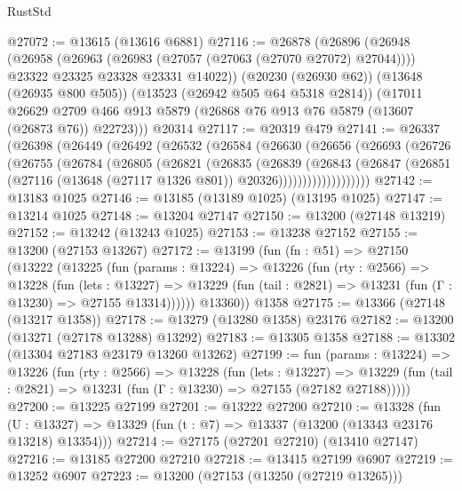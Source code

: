 \begin{lexlean}{RustStd}
\begin{coremodule}
@27072 := @13615 (@13616 @6881)
@27116 := @26878
    (@26896
      (@26948
        (@26958
          (@26963 (@26983 (@27057 (@27063 (@27070 @27072) @27044))))
          @23322
          @23325
          @23328
          @23331
          @14022))
      (@20230 (@26930 @62))
      (@13648 (@26935 @800 @505))
      (@13523 (@26942 @505 @64 @5318 @2814))
      (@17011
        @26629
        @2709
        @466
        @913
        @5879
        (@26868 @76 @913 @76 @5879 (@13607 (@26873 @76)) @22723)))
    @20314
@27117 := @20319 @479
@27141 := @26337
    (@26398
      (@26449
        (@26492
          (@26532
            (@26584
              (@26630
                (@26656
                  (@26693
                    (@26726
                      (@26755
                        (@26784
                          (@26805
                            (@26821
                              (@26835
                                (@26839
                                  (@26843
                                    (@26847
                                      (@26851
                                        (@27116
                                          (@13648 (@27117 @1326 @801))
                                          @20326)))))))))))))))))))
@27142 := @13183 @1025
@27146 := @13185 (@13189 @1025) (@13195 @1025)
@27147 := @13214 @1025
@27148 := @13204 @27147
@27150 := @13200 (@27148 @13219)
@27152 := @13242 (@13243 @1025)
@27153 := @13238 @27152
@27155 := @13200 (@27153 @13267)
@27172 := @13199
    (fun (fn : @51) =>
    @27150
      (@13222
        (@13225
          (fun (params : @13224) =>
          @13226
            (fun (rty : @2566) =>
            @13228
              (fun (lets : @13227) =>
              @13229 (fun (tail : @2821) => @13231 (fun (Γ : @13230) => @27155 @13314))))))
        @13360))
    @1358
@27175 := @13366 (@27148 (@13217 @1358))
@27178 := @13279 (@13280 @1358) @23176
@27182 := @13200 (@13271 (@27178 @13288) @13292)
@27183 := @13305 @1358
@27188 := @13302 (@13304 @27183 @23179 @13260 @13262)
@27199 := fun (params : @13224) =>
  @13226
    (fun (rty : @2566) =>
    @13228
      (fun (lets : @13227) =>
      @13229 (fun (tail : @2821) => @13231 (fun (Γ : @13230) => @27155 (@27182 @27188)))))
@27200 := @13225 @27199
@27201 := @13222 @27200
@27210 := @13328
    (fun (U : @13327) => @13329 (fun (t : @7) => @13337 (@13200 (@13343 @23176 @13218) @13354)))
@27214 := @27175 (@27201 @27210) (@13410 @27147)
@27216 := @13185 @27200 @27210
@27218 := @13415 @27199 @6907
@27219 := @13252 @6907
@27223 := @13200 (@27153 (@13250 (@27219 @13265)))

\end{coremodule}
\end{lexlean}
